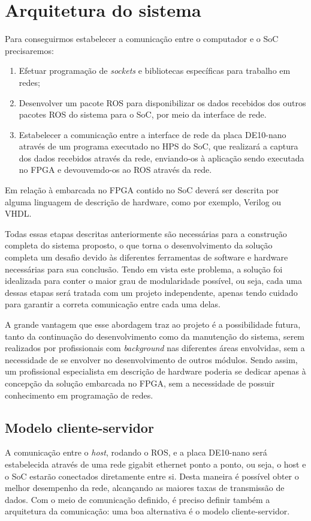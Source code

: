 \chapter{Arquitetura do sistema}\label{cap:arquitetura}

Para conseguirmos estabelecer a comunicação entre o computador e o SoC precisaremos:

\begin{enumerate}
	\item Efetuar programação de \textit{sockets} e bibliotecas específicas para trabalho em redes; 
	
	\item Desenvolver um pacote ROS para disponibilizar os dados recebidos dos outros pacotes ROS do sistema para o SoC, por meio da interface de rede. 
	
	\item Estabelecer a comunicação entre a interface de rede da placa DE10-nano através de um programa executado no HPS do SoC, que realizará a captura dos dados recebidos através da rede, enviando-os à aplicação sendo executada no FPGA e devouvemdo-os ao ROS através da rede. 
\end{enumerate}

Em relação à embarcada no FPGA contido no SoC deverá ser descrita por alguma linguagem de descrição de hardware, como por exemplo, Verilog ou VHDL\@.

Todas essas etapas descritas anteriormente são necessárias para a construção completa do sistema proposto, o que torna o desenvolvimento da solução completa um desafio devido às diferentes ferramentas de software e hardware necessárias para sua conclusão. Tendo em vista este problema, a solução foi idealizada para conter o maior grau de modularidade possível, ou seja, cada uma dessas etapas será tratada com um projeto independente, apenas tendo cuidado para garantir a correta comunicação entre cada uma delas.

A grande vantagem que esse abordagem traz ao projeto é a possibilidade futura, tanto da continuação do desenvolvimento como da manutenção do sistema, serem realizados por profissionais com \textit{background} nas diferentes áreas envolvidas, sem a necessidade de se envolver no desenvolvimento de outros módulos. Sendo assim, um profissional especialista em descrição de hardware poderia se dedicar apenas à concepção da solução embarcada no FPGA, sem a necessidade de possuir conhecimento em programação de redes. 

\section{Modelo cliente-servidor}
A comunicação entre o \textit{host}, rodando o ROS, e a placa DE10-nano será estabelecida através de uma rede gigabit ethernet ponto a ponto, ou seja, o host e o SoC estarão conectados diretamente entre si. Desta maneira é possível obter o melhor desempenho da rede, alcançando as maiores taxas de transmissão de dados. Com o meio de comunicação definido, é preciso definir também a arquitetura da comunicação: uma boa alternativa é o modelo cliente-servidor.

